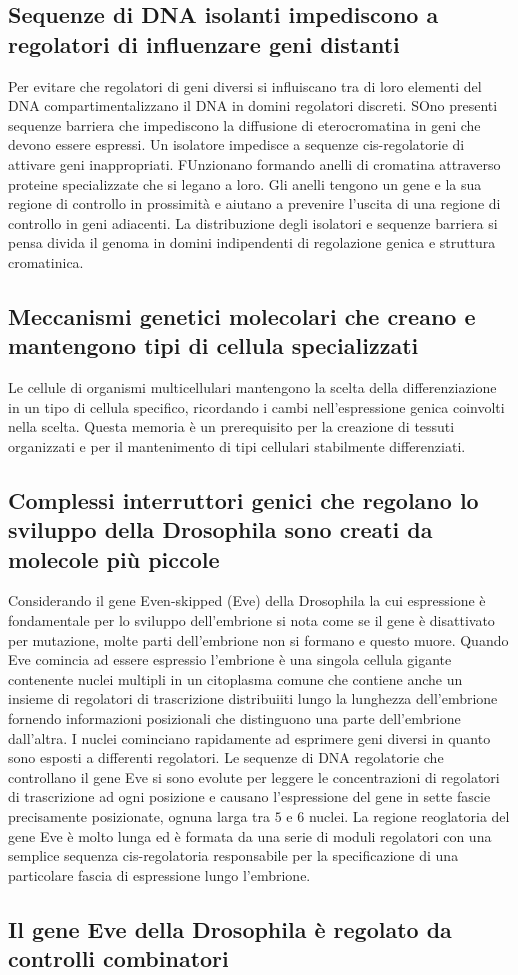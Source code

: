 \subsection{Sequenze di DNA isolanti impediscono a regolatori di influenzare geni distanti}
Per evitare che regolatori di geni diversi si influiscano tra di loro elementi del DNA compartimentalizzano il DNA in domini regolatori discreti. SOno presenti sequenze barriera che
impediscono la diffusione di eterocromatina in geni che devono essere espressi. Un isolatore impedisce a sequenze cis-regolatorie di attivare geni inappropriati. FUnzionano formando 
anelli di cromatina attraverso proteine specializzate che si legano a loro. Gli anelli tengono un gene e la sua regione di controllo in prossimit\`a e aiutano a prevenire l'uscita di 
una regione di controllo in geni adiacenti. La distribuzione degli isolatori e sequenze barriera si pensa divida il genoma in domini indipendenti di regolazione genica e struttura 
cromatinica. 
\subsection{Meccanismi genetici molecolari che creano e mantengono tipi di cellula specializzati}
Le cellule di organismi multicellulari mantengono la scelta della differenziazione in un tipo di cellula specifico, ricordando i cambi nell'espressione genica coinvolti nella scelta.
Questa memoria \`e un prerequisito per la creazione di tessuti organizzati e per il mantenimento di tipi cellulari stabilmente differenziati. 
\subsection{Complessi interruttori genici che regolano lo sviluppo della Drosophila sono creati da molecole pi\`u piccole}
Considerando il gene Even-skipped (Eve) della Drosophila la cui espressione \`e fondamentale per lo sviluppo dell'embrione si nota come se il gene \`e disattivato per mutazione, molte
parti dell'embrione non si formano e questo muore. Quando Eve comincia ad essere espressio l'embrione \`e una singola cellula gigante contenente nuclei multipli in un citoplasma comune 
che contiene anche un insieme di regolatori di trascrizione distribuiiti lungo la lunghezza dell'embrione fornendo informazioni posizionali che distinguono una parte dell'embrione 
dall'altra. I nuclei cominciano rapidamente ad esprimere geni diversi in quanto sono esposti a differenti regolatori. Le sequenze di DNA regolatorie che controllano il gene Eve si 
sono evolute per leggere le concentrazioni di regolatori di trascrizione ad ogni posizione e causano l'espressione del gene in sette fascie precisamente posizionate, ognuna larga tra
$5$ e $6$ nuclei. La regione reoglatoria del gene Eve \`e molto lunga ed \`e formata da una serie di moduli regolatori con una semplice sequenza cis-regolatoria responsabile per la
specificazione di una particolare fascia di espressione lungo l'embrione.
\subsection{Il gene Eve della Drosophila \`e regolato da controlli combinatori}

